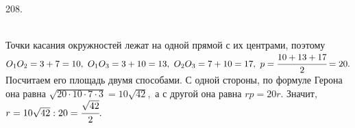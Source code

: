 208. \begin{figure}[ht!]
\end{figure}\\
Точки касания окружностей лежат на одной прямой с их центрами, поэтому $O_1O_2=3+7=10,\ O_1O_3=3+10=13,\ O_2O_3=7+10=17,\ p=\cfrac{10+13+17}{2}=20.$ Посчитаем его площадь двумя способами. С одной стороны, по формуле Герона она равна $\sqrt{20\cdot10\cdot7\cdot3}=10\sqrt{42},$ а с другой она равна $rp=20r.$ Значит, $r=10\sqrt{42}:20=\cfrac{\sqrt{42}}{2}.$\\
